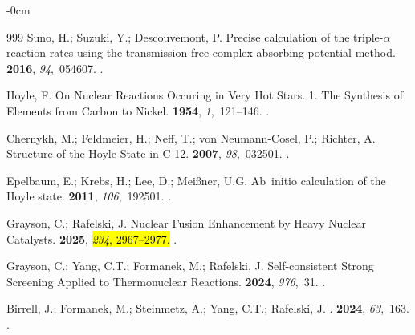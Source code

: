 \documentclass[particles,article,accept,pdftex,moreauthors]{Definitions/mdpi}
\begin{document}
\begin{adjustwidth}{-\extralength}{0cm}
\begin{thebibliography}{999}
Suno, H.; Suzuki, Y.;  Descouvemont, P.
\newblock Precise calculation of the triple-\ensuremath{\alpha} reaction rates
  using the transmission-free complex absorbing potential method.
 {\bf 2016}, {\em 94},~054607.
.

Hoyle, F.
\newblock On Nuclear Reactions Occuring in Very Hot Stars. 1. The Synthesis of
  Elements from Carbon to Nickel.
 {\bf 1954}, {\em 1},~121--146.
.

Chernykh, M.; Feldmeier, H.;  Neff, T.; von Neumann-Cosel, P.; Richter, A.
\newblock Structure of the Hoyle State in C-12.
 {\bf 2007}, {\em 98},~032501.
.

Epelbaum, E.; Krebs, H.;  Lee, D.; Meißner, U.G.
\newblock Ab~initio calculation of the Hoyle state.
 {\bf 2011}, {\em 106},~192501.
.

Grayson, C.; Rafelski, J.
\newblock Nuclear Fusion Enhancement by Heavy Nuclear Catalysts.
 {\bf 2025}, \hl{\emph{234},  2967–2977.}
.

Grayson, C.; Yang, C.T.; Formanek, M.; Rafelski, J.
\newblock Self-consistent Strong Screening Applied to Thermonuclear Reactions.
 {\bf 2024}, {\em 976},~31.
.

Birrell, J.; Formanek, M.;  Steinmetz, A.; Yang, C.T.; Rafelski, J.
.
 {\bf 2024}, {\em 63},~163.
.


\end{thebibliography}
\end{adjustwidth}
\end{document}
